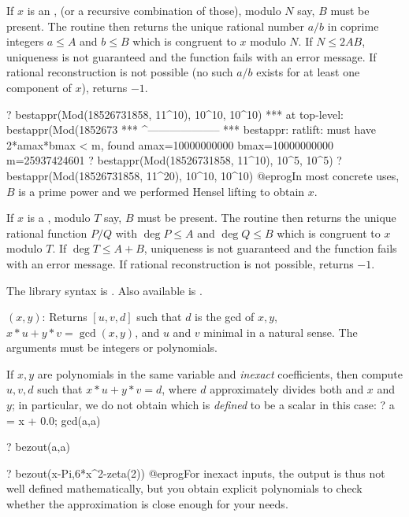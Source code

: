 If $x$ is an ,  (or a recursive combination of
those), modulo $N$ say, $B$ must be present. The routine then returns the
unique rational number $a/b$ in coprime integers $a\leq A$ and $b\leq B$ which
is congruent to $x$ modulo $N$. If $N \leq 2AB$, uniqueness is not guaranteed
and the function fails with an error message. If rational reconstruction is not
possible (no such $a/b$ exists for at least one component of $x$), returns
$-1$.

\bprog
? bestappr(Mod(18526731858, 11^10), 10^10, 10^10)
 ***   at top-level: bestappr(Mod(1852673
 ***                 ^--------------------
 *** bestappr: ratlift: must have 2*amax*bmax < m, found
       amax=10000000000
       bmax=10000000000
       m=25937424601
? bestappr(Mod(18526731858, 11^10), 10^5, 10^5)
? bestappr(Mod(18526731858, 11^20), 10^10, 10^10)
@eprog\noindent In most concrete uses, $B$ is a prime power and we performed
Hensel lifting to obtain $x$.

If $x$ is a , modulo $T$ say, $B$ must be present. The routine
then returns the unique rational function $P/Q$ with  $\deg P\leq A$ and $\deg
Q\leq B$ which is congruent to $x$ modulo $T$. If $\deg T \leq A+B$, uniqueness
is not guaranteed and the function fails with an error message. If rational
reconstruction is not possible, returns $-1$.

The library syntax is .
Also available is .

$(x,y)$: \label{se:bezout}Returns $[u,v,d]$ such that $d$ is the gcd of $x,y$,
$x*u+y*v=\gcd(x,y)$, and $u$ and $v$ minimal in a natural sense.
The arguments must be integers or polynomials. 

If $x,y$ are polynomials in the same variable and \emph{inexact}
coefficients, then compute $u,v,d$ such that $x*u+y*v = d$, where $d$
approximately divides both and $x$ and $y$; in particular, we do not obtain
 which is \emph{defined} to be a scalar in this case:
\bprog
? a = x + 0.0; gcd(a,a)

? bezout(a,a)

? bezout(x-Pi,6*x^2-zeta(2))
@eprog\noindent For inexact inputs, the output is thus not well defined
mathematically, but you obtain explicit polynomials to check whether the
approximation is close enough for your needs.

